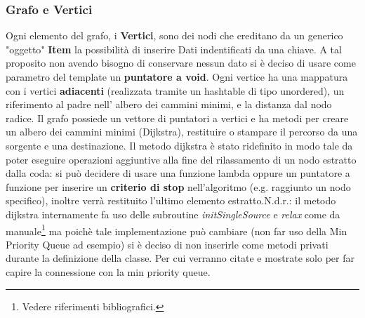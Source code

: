 \newpage
\subsubsection{Grafo e Vertici}
\indent Ogni elemento del grafo, i \textbf{Vertici}, sono dei nodi che ereditano da un generico "oggetto"
\textbf{Item} la possibilit\`a di inserire Dati indentificati da una chiave. A tal proposito non avendo
bisogno di conservare nessun dato si \`e deciso di usare come parametro del template un \textbf{puntatore
a void}. Ogni vertice ha una mappatura con i vertici \textbf{adiacenti} (realizzata tramite un hashtable
di tipo unordered), un riferimento al padre nell' albero dei cammini minimi, e la distanza dal nodo radice.
\newline\indent Il grafo possiede un vettore di puntatori a vertici e ha metodi per creare un albero
dei cammini minimi (Dijkstra), restituire o stampare il percorso da una sorgente e una destinazione.
Il metodo dijkstra \`e stato ridefinito in modo tale da poter eseguire operazioni aggiuntive alla fine
del rilassamento di un nodo estratto dalla coda: si pu\`o decidere di usare una funzione lambda oppure un
puntatore a funzione per inserire un \textbf{criterio di stop} nell'algoritmo (e.g. raggiunto un nodo
specifico), inoltre verr\`a restituito l'ultimo elemento estratto.\newline N.d.r.: il metodo dijkstra
internamente fa uso delle subroutine \textit{initSingleSource} e \textit{relax} come da
manuale\footnote{Vedere riferimenti bibliografici.} ma poich\`e tale implementazione
pu\`o cambiare (non far uso della Min Priority Queue ad esempio) si \`e deciso di non inserirle come
metodi privati durante la definizione della classe. Per cui verranno citate e mostrate solo per far capire
la connessione con la min priority queue.

